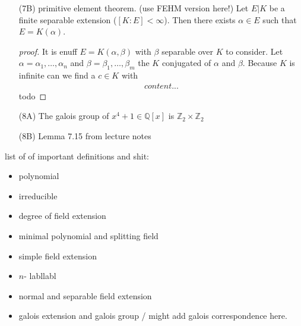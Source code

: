 \documentclass[]{scrartcl}
\newcommand{\Z}{\mathbb{Z}}
\newcommand{\Q}{\mathbb{Q}}
\newcommand{\<}{\trianglelefteq}
\begin{document}
\begin{itemize}
\begin{proof}[proof]
		Now if $ \beta_1 \in E $ then $ E(\beta_1) = E $ and therefore $ [E(\beta_1): E] = 1 $. By our above considerations we deduce
		$ [E(\beta_2): E] = 1 $, which in turn means $ \beta_2 \in E $. That is, if $ g(x) $ has a zero in $ E $ then 
		every other zero of $ g(x) $ will be contained in $ E $ as well. This means that $ E|K $ is normal.
	\end{proof}
	\item[(7B)] primitive element theorem. (use FEHM version here!)
	Let $ E|K $ be a finite separable extension ($[K\colon E] < \infty$). Then there exists $ \alpha \in E $ such that $ E = K(\alpha) $.
	\begin{proof}[proof]
		It is enuff $E = K(\alpha, \beta)$ with $\beta$ separable over $K$ to consider. Let $\alpha = \alpha_1, \dots, \alpha_n$ and $\beta = \beta_1, \dots, \beta_m$ the $K$ conjugated of $\alpha$ and $\beta$. Because $K$ is infinite can we find a $c \in K$ with 
		\begin{align*}
		content...
		\end{align*}
		todo
	\end{proof}
	\item[(8A)] The galois group of $x^4 +1 \in \Q[x]$ is $\Z_2 \times \Z_2$ 
	\item[(8B)] Lemma 7.15 from lecture notes
\end{itemize}

list of of important definitions and shit:
\begin{itemize}
	\item polynomial
	\item irreducible
	\item degree of field extension
	\item minimal polynomial and splitting field
	\item simple field extension
	\item $n$- labllabl
	\item normal and separable field extension
	\item galois extension and galois group / might add galois correspondence here.
\end{itemize}
\end{document}
